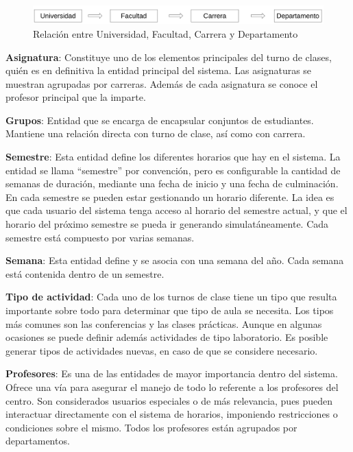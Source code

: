 \begin{figure}[h!]
	\centering
	\includegraphics[width=1\linewidth]{images/Chapter 2/department_relation}
	\caption{Relación entre Universidad, Facultad, Carrera y Departamento}
	\label{fig:department_relation}
\end{figure}

\textbf{Asignatura}: Constituye uno de los elementos principales del turno de clases, quién es en definitiva la entidad principal del sistema. Las asignaturas se muestran agrupadas por carreras. Además de cada asignatura se conoce el profesor principal que la imparte.

\textbf{Grupos}: Entidad que se encarga de encapsular conjuntos de estudiantes. Mantiene una relación directa con turno de clase, así como con carrera. 

\textbf{Semestre}: Esta entidad define los diferentes horarios que hay en el sistema. La entidad se llama
“semestre” por convención, pero es configurable la cantidad de semanas de duración, mediante una fecha de inicio y una fecha de culminación. En cada semestre
se pueden estar gestionando un horario diferente. La idea es que cada usuario del sistema tenga acceso al horario del semestre actual, y que el horario del próximo semestre se pueda ir generando simulatáneamente. Cada semestre está compuesto por varias semanas.

\textbf{Semana}: Esta entidad define y se asocia con una semana del año. Cada semana está contenida dentro de un semestre.

\textbf{Tipo de actividad}: Cada uno de los turnos de clase tiene un tipo que resulta importante sobre todo
 para determinar que tipo de aula se necesita. Los tipos más comunes son las conferencias y las clases
 prácticas. Aunque en algunas ocasiones se puede definir además actividades de tipo laboratorio. Es posible generar tipos de actividades nuevas, en caso de que se considere necesario.

\textbf{Profesores}: Es una de las entidades de mayor importancia dentro del sistema. Ofrece una vía para asegurar el manejo de todo lo referente a los profesores del centro. Son considerados usuarios especiales o de más relevancia, pues pueden interactuar directamente con el sistema de horarios, imponiendo restricciones o condiciones sobre el mismo. Todos los profesores están agrupados por departamentos.

